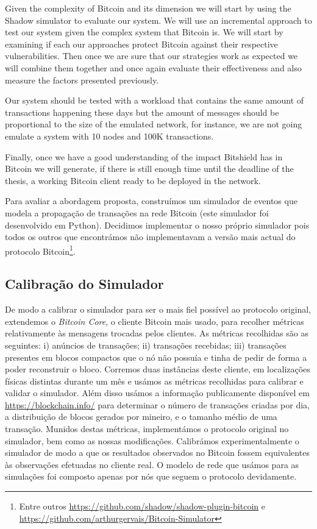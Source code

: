 Given the complexity of Bitcoin and its dimension we will start by using the Shadow simulator \cite{jansen2011shadow} to evaluate our system. We will use an incremental approach to test our system given the complex system that Bitcoin is. We will start by examining if each our approaches protect Bitcoin against their respective vulnerabilities. Then once we are sure that our strategies work as expected we will combine them together and once again evaluate their effectiveness and also measure the factors presented previously.

Our system should be tested with a workload that contains the same amount of transactions happening these days but the amount of messages should be proportional to the size of the emulated network, for instance, we are not going emulate a system with 10 nodes and 100K transactions.

Finally, once we have a good understanding of the impact Bitshield has in Bitcoin we will generate, if there is still enough time until the deadline of the thesis, a working Bitcoin client ready to be deployed in the network.

Para avaliar a abordagem proposta, construímos um simulador de eventos que modela a propagação de transações na rede Bitcoin (este simulador foi desenvolvido em Python). Decidimos implementar o nosso próprio simulador pois todos os outros que encontrámos não implementavam a versão mais actual do protocolo Bitcoin\footnote{Entre outros \url{https://github.com/shadow/shadow-plugin-bitcoin} e\\ \url{https://github.com/arthurgervais/Bitcoin-Simulator}}.

\subsection{Calibração do Simulador}
\label{sec:calibracao}
De modo a calibrar o simulador para ser o mais fiel possível ao protocolo original, extendemos o \textit{Bitcoin Core}, o cliente Bitcoin mais usado, para recolher métricas relativamente às mensagens trocadas pelos clientes.
As métricas recolhidas são as seguintes: i) anúncios de transações; ii) transações recebidas; iii) transações presentes em blocos compactos que o nó não possuía e tinha de pedir de forma a poder reconstruir o bloco.
Corremos duas instâncias deste cliente, em localizações físicas distintas durante um mês e usámos as métricas recolhidas para calibrar e validar o simulador.
Além disso usámos a informação publicamente disponível em \url{https://blockchain.info/} para determinar o número de transações criadas por dia, a distribuição de blocos gerados por mineiro, e o tamanho médio de uma transação.
Munidos destas métricas, implementámos o protocolo original no simulador, bem como as nossas modificações. Calibrámos experimentalmente o simulador de modo a que os resultados observados no Bitcoin fossem equivalentes às observações efetuadas no cliente real.
O modelo de rede que usámos para as simulações foi composto apenas por nós que seguem o protocolo devidamente.

